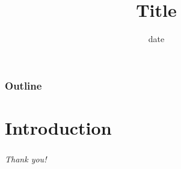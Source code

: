 \documentclass[hyperref={bookmarks=false},aspectratio=169]{beamer}
\title[]
{\bfseries{Title}}
\subtitle {
}
\author[] {
}
\institute[] {
}
\date {date}
\begin{document}
\frame{\titlepage}  %

\begin{frame}
\frametitle{Outline}
\tableofcontents
\end{frame}

\section{Introduction}


\begin{frame}
\frametitle{}

\centering
{\Huge \textit{Thank you!}}

\end{frame}
\end{document}
